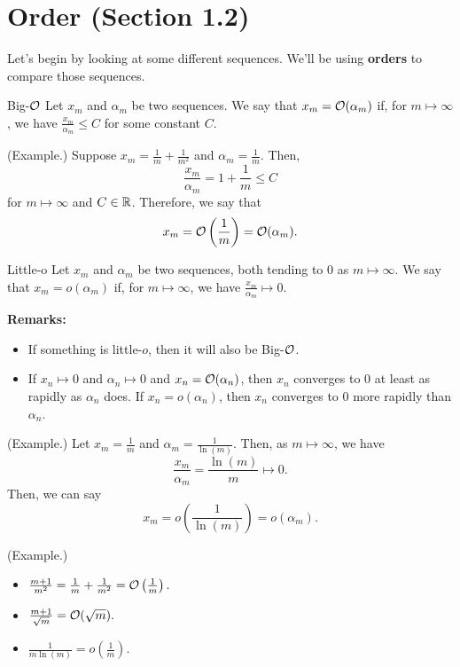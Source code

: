\documentclass[letterpaper]{article}
\begin{document}
\section{Order (Section 1.2)}
Let's begin by looking at some different sequences. We'll be using \textbf{orders} to compare those sequences.
\begin{definition}{Big-$\mathcal{O}$}{} 
    Let $x_m$ and $\alpha_m$ be two sequences. We say that $x_m = \mathcal{O}(\alpha_m)$ if, for $m \mapsto \infty$, we have $\frac{x_m}{\alpha_m} \leq C$ for some constant $C$.
\end{definition}


\begin{mdframed}
    (Example.) Suppose $x_m = \frac{1}{m} + \frac{1}{m^2}$ and $\alpha_m = \frac{1}{m}$. Then, \[\frac{x_m}{\alpha_m} = 1 + \frac{1}{m} \leq C\] for $m \mapsto \infty$ and $C \in \mathbb{R}$. Therefore, we say that \[x_m = \mathcal{O}\left(\frac{1}{m}\right) = \mathcal{O}(\alpha_m).\]
\end{mdframed}

\begin{definition}{Little-o}{}
    Let $x_m$ and $\alpha_m$ be two sequences, both tending to 0 as $m \mapsto \infty$. We say that $x_m = o(\alpha_m)$ if, for $m \mapsto \infty$, we have $\frac{x_m}{\alpha_m} \mapsto 0$. 
\end{definition}
\textbf{Remarks:} 
\begin{itemize}
    \item If something is little-$o$, then it will also be Big-$\mathcal{O}$. 
    \item If $x_n \mapsto 0$ and $\alpha_n \mapsto 0$ and $x_n = \mathcal{O}(\alpha_n)$, then $x_n$ converges to 0 at least as rapidly as $\alpha_n$ does. If $x_n = o(\alpha_n)$, then $x_n$ converges to 0 more rapidly than $\alpha_n$. 
\end{itemize}

\begin{mdframed}
    (Example.) Let $x_m = \frac{1}{m}$ and $\alpha_m = \frac{1}{\ln(m)}$. Then, as $m \mapsto \infty$, we have \[\frac{x_m}{\alpha_m} = \frac{\ln(m)}{m} \mapsto 0.\]
    Then, we can say \[x_m = o\left(\frac{1}{\ln(m)}\right) = o(\alpha_m).\]
\end{mdframed}

\begin{mdframed}
    (Example.) 
    \begin{itemize}
        \item $\frac{m + 1}{m^2} = \frac{1}{m} + \frac{1}{m^2} = \mathcal{O}\left(\frac{1}{m}\right).$
        \item $\frac{m + 1}{\sqrt{m}} = \mathcal{O}(\sqrt{m}).$
        \item $\frac{1}{m\ln(m)} = o\left(\frac{1}{m}\right).$
    \end{itemize}
\end{mdframed}
\end{document}
